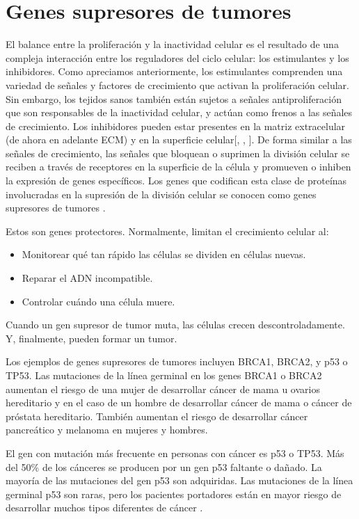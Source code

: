 \section{Genes supresores de tumores}
\hspace{.1cm}El balance entre la proliferación y la inactividad celular es el resultado de una compleja interacción entre los reguladores del ciclo celular: los estimulantes y los inhibidores. Como apreciamos anteriormente, los estimulantes comprenden una variedad de señales y factores de crecimiento que activan la proliferación celular. Sin embargo, los tejidos sanos también están sujetos a señales antiproliferación que son responsables de la inactividad celular, y actúan como frenos a las señales de crecimiento. Los inhibidores pueden estar presentes en la matriz extracelular (de ahora en adelante ECM) y en la superficie celular[\cite{robins}, \cite{hanahan}, \cite{cancerbook}]. De forma similar a las señales de crecimiento, las señales que bloquean o suprimen la división celular se reciben a través de receptores en la superficie de la célula y promueven o inhiben la expresión de genes específicos. Los genes que codifican esta clase de proteínas involucradas en la supresión de la división celular se conocen como genes supresores de tumores \cite{viabarre2019}.

\hspace{.1cm}Estos son genes protectores. Normalmente, limitan el crecimiento celular al:
\begin{itemize}
    \item Monitorear qué tan rápido las células se dividen en células nuevas.
    \item Reparar el ADN incompatible.
    \item Controlar cuándo una célula muere.
\end{itemize}
Cuando un gen supresor de tumor muta, las células crecen descontroladamente. Y, finalmente, pueden formar un tumor.

\hspace{.1cm}Los ejemplos de genes supresores de tumores incluyen BRCA1, BRCA2, y p53 o TP53. Las mutaciones de la línea germinal en los genes BRCA1 o BRCA2 aumentan el riesgo de una mujer de desarrollar cáncer de mama u ovarios hereditario y en el caso de un hombre de desarrollar cáncer de mama o cáncer de próstata hereditario. También aumentan el riesgo de desarrollar cáncer pancreático y melanoma en mujeres y hombres.

\hspace{.1cm}El gen con mutación más frecuente en personas con cáncer es p53 o TP53. Más del 50\% de los cánceres se producen por un gen p53 faltante o dañado. La mayoría de las mutaciones del gen p53 son adquiridas. Las mutaciones de la línea germinal p53 son raras, pero los pacientes portadores están en mayor riesgo de desarrollar muchos tipos diferentes de cáncer \cite{genotipia2024}.

